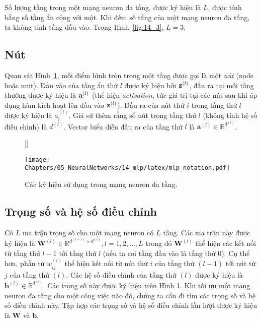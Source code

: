 Số lượng tầng trong một mạng neuron đa tầng, được ký hiệu là $L$, được
tính bằng số tầng ẩn cộng với một. Khi đếm số tầng của một
mạng neuron đa tầng, ta không tính tầng đầu vào. Trong Hình~\ref{fig:14_3}, $L = 3$.

\subsection{Nút}
Quan sát Hình~\ref{fig:14_4}, mỗi điểm hình tròn trong một tầng được
gọi là một \textit{nút} (node hoặc unit). Đầu vào của tầng ẩn thứ $l$ được ký hiệu bởi $\mathbf{z}^{(l)}$, đầu ra tại mỗi tầng thường được ký
hiệu là $\mathbf{a}^{(l)}$ (thể hiện \textit{activation}, tức giá trị tại các nút sau
khi áp dụng hàm kích hoạt lên đầu vào $\mathbf{z}^{(l)}$). Đầu ra của nút
thứ $i$ trong tầng thứ $l$ được ký hiệu là $a_i^{(l)}$. Giả sử thêm rằng số
nút trong tầng thứ $l$ (không tính hệ số điều chỉnh) là $d^{(l)}$. Vector biểu diễn đầu ra
của tầng thứ $l$ là $\mathbf{a}^{(l)} \in \mathbb{R}^{d^{(l)}}$.



\begin{figure}[t]
[\FBwidth]
{\caption{
Các ký hiệu sử dụng trong mạng neuron đa tầng.
}
\label{fig:14_4}}
{ %
\texttt{[image: Chapters/05\_NeuralNetworks/14\_mlp/latex/mlp\_notation.pdf]}
}
\end{figure}


\subsection{Trọng số và hệ số điều chỉnh}
Có $L$ ma trận trọng số cho một mạng neuron có $L$ tầng. Các ma
trận này được ký hiệu là $\mathbf{W}^{(l)} \in \mathbb{R}^{d^{(l-1)}\times
d^{(l)}}, l = 1, 2, \dots, L$ trong đó $\mathbf{W}^{(l)}$ thể hiện các
{kết nối} từ tầng thứ $l-1$ tới tầng thứ $l$ (nếu ta coi tầng đầu vào là
tầng thứ $0$). Cụ thể hơn, phần tử $w^{(l)}_{ij}$ thể hiện kết nối từ nút thứ
$i$ của tầng thứ $(l-1)$ tới nút từ $j$ của tầng thứ $(l)$. Các hệ số điều chỉnh của
tầng thứ $(l)$ được ký hiệu là $\mathbf{b}^{(l)} \in \mathbb{R}^{d^{(l)}}$. Các
trọng số này được ký hiệu trên Hình \ref{fig:14_4}. Khi tối ưu một
mạng neuron đa tầng cho một công việc nào đó, chúng ta cần đi tìm các
trọng số và hệ số điều chỉnh này. Tập hợp các trọng số và hệ số điều chỉnh lần lượt được ký hiệu là
$\mathbf{W}$ và $\mathbf{b}$.


